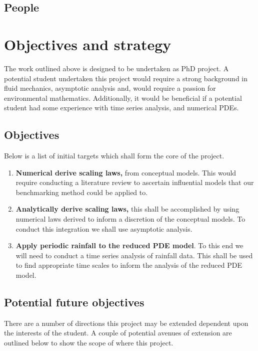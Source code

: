 \documentclass[11pt]{article}
\begin{document}
\vspace{5pt}
\subsection{People}



\section{Objectives and strategy}

The work outlined above is designed to be undertaken as PhD project. A potential student undertaken this project would require a strong background in fluid mechanics, asymptotic analysis and, would require a passion for environmental mathematics. 
Additionally, it would be beneficial if a potential student had some experience with time series analysis, and numerical PDEs.

\subsection{Objectives}
Below is a list of initial targets which shall form the core of the project.

\begin{enumerate}
    \item \textbf{Numerical derive scaling laws,} from conceptual models. This would require conducting a literature review to ascertain influential models that our benchmarking method could be applied to.
    \item \textbf{Analytically derive scaling laws,} this shall be accomplished by using numerical laws derived to inform a discretion of the conceptual models. To conduct this integration we shall use asymptotic analysis.
    \item \textbf{Apply periodic rainfall to the reduced PDE model}. To this end we will need to conduct a time series analysis of rainfall data. This shall be used to find appropriate time scales to inform the analysis of the reduced PDE model.
\end{enumerate}

\subsection{Potential future objectives}

There are a number of directions this project may be extended dependent upon the interests of the student. A couple of potential avenues of extension are outlined below to show the scope of where this project.
\end{document}
